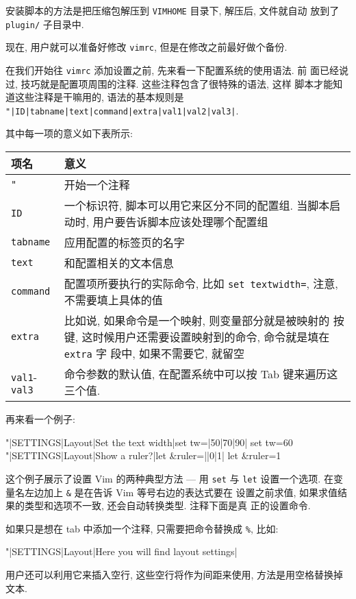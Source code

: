 安装脚本的方法是把压缩包解压到 \texttt{VIMHOME} 目录下, 解压后, 文件就自动
放到了 \texttt{plugin/} 子目录中.

现在, 用户就可以准备好修改 \texttt{vimrc}, 但是在修改之前最好做个备份.

在我们开始往 \texttt{vimrc} 添加设置之前, 先来看一下配置系统的使用语法. 前
面已经说过, 技巧就是配置项周围的注释. 这些注释包含了很特殊的语法, 这样
脚本才能知道这些注释是干嘛用的, 语法的基本规则是
\texttt{"|ID|tabname|text|command|extra|val1|val2|val3|}.

其中每一项的意义如下表所示:
\begin{center}
  \begin{tabular}{lp{30em}}
  \hline
  项名 & 意义 \\
  \hline
   \texttt{"}	& 开始一个注释 \\
   \texttt{ID}	& 一个标识符, 脚本可以用它来区分不同的配置组. 当脚本启动时,
     用户要告诉脚本应该处理哪个配置组 \\
   \texttt{tabname} & 应用配置的标签页的名字 \\
   \texttt{text} & 和配置相关的文本信息 \\
   \texttt{command} & 配置项所要执行的实际命令, 比如 \texttt{set textwidth=},
     注意, 不需要填上具体的值 \\
	  \texttt{extra} & 比如说, 如果命令是一个映射, 则变量部分就是被映射的
	  按键, 这时候用户还需要设置映射到的命令, 命令就是填在 \texttt{extra} 字
	  段中, 如果不需要它, 就留空 \\

	  \texttt{val1}-\texttt{val3} & 命令参数的默认值, 在配置系统中可以按
	  Tab 键来遍历这三个值. \\
	\hline
	\end{tabular}
\end{center}

再来看一个例子:
\begin{vimcode}
"|SETTINGS|Layout|Set the text width|set tw=|50|70|90|
set tw=60
"|SETTINGS|Layout|Show a ruler?|let &ruler=||0|1|
let &ruler=1
\end{vimcode}
这个例子展示了设置 Vim 的两种典型方法 --- 用 \texttt{set} 与 \texttt{let}
设置一个选项. 在变量名左边加上 \texttt{\&} 是在告诉 Vim 等号右边的表达式要在
设置之前求值, 如果求值结果的类型和选项不一致, 还会自动转换类型. 注释下面是真
正的设置命令.

如果只是想在 tab 中添加一个注释, 只需要把命令替换成 \verb'%', 比如:
\begin{vimcode}
"|SETTINGS|Layout|Here you will find layout settings|%
\end{vimcode}
用户还可以利用它来插入空行, 这些空行将作为间距来使用, 方法是用空格替换掉文本.

